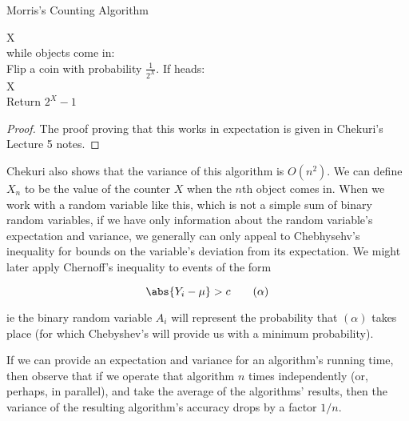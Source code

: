 \documentclass[../main.tex]{subfiles}
\begin{document}
\begin{definition}{Morris's Counting Algorithm}

    \begin{algo}
        X  \\
        while objects come in: \+\\
        Flip a coin with probability $\frac{1}{2^{X}}$.
        If heads: \+\\
        X  \-\-\\
        Return $2^{X} - 1$ \\
    \end{algo}
    
\end{definition}
\begin{proof}
    The proof proving that this works in expectation is
    given in Chekuri's Lecture 5 notes.
\end{proof}

\begin{remark}
    Chekuri also shows that the variance of this algorithm is $O(n^2)$. We can define $X_n$ to be the value of the counter $X$ when the $n$th object comes in. When we work with a random variable like this, which is not a simple sum of binary random variables, if we have only information about the random variable's expectation and variance, we generally can only appeal to Chebhysehv's inequality for bounds on the variable's deviation from its expectation. We might later apply Chernoff's inequality to events of the form

    \[
        \abs{Y_{i} - \mu} > c \tag{$\alpha$}
    \]

    ie the binary random variable $A_{i}$ will represent the probability that $(\alpha)$ takes place (for which Chebyshev's will provide us with a minimum probability).
\end{remark}

\begin{remark}
    If we can provide an expectation and variance for an algorithm's running time, then observe that if we operate that algorithm $n$ times independently (or, perhaps, in parallel), and take the average of the algorithms' results, then the variance of the resulting algorithm's accuracy drops by a factor $1/n$.
\end{remark}
\end{document}
